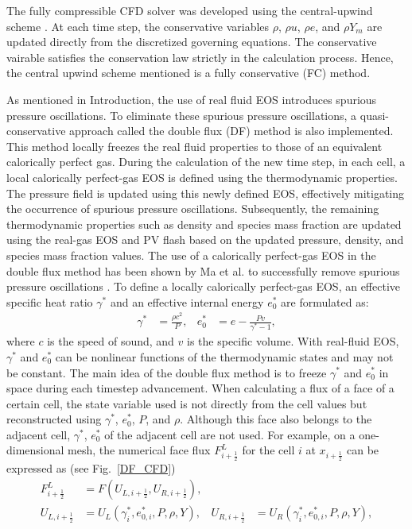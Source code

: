 The fully compressible CFD solver was developed using the central-upwind scheme \cite{kurganov2001semidiscrete,greenshields2010implementation}. At each time step, the conservative variables $\rho$, $\rho u$, $\rho e$, and $\rho Y_m$ are updated directly from the discretized governing equations. The conservative vairable satisfies the conservation law strictly in the calculation process. Hence, the central upwind scheme mentioned is a fully conservative (FC) method. 

As mentioned in Introduction, the use of real fluid EOS introduces spurious pressure oscillations. To eliminate these spurious pressure oscillations, a quasi-conservative approach called the double flux (DF) method \cite{abgrall2001computations,billet2003adaptive,ma2017entropy} is also implemented.
This method locally freezes the real fluid properties to those of an equivalent calorically perfect gas. During the calculation of the new time step, in each cell, a local calorically perfect-gas EOS is defined using the thermodynamic properties. The pressure field is updated using this newly defined EOS, effectively mitigating the occurrence of spurious pressure oscillations. Subsequently, the remaining thermodynamic properties such as density and species mass fraction are updated using the real-gas EOS and PV flash based on the updated pressure, density, and species mass fraction values. The use of a calorically perfect-gas EOS in the double flux method has been shown by Ma et al. to successfully remove spurious pressure oscillations \cite{ma2017entropy}. To define a locally calorically perfect-gas EOS, an effective specific heat ratio $\gamma^*$ and an effective internal energy $e_0^*$  are formulated as:
\begin{align}
\gamma^*& = \frac{\rho c^2}{P},&e_0^*&= e-\frac{Pv}{\gamma^*-1}, \label{eq:IGEOS}
\end{align}
where $c$ is the speed of sound, and $v$ is the specific volume. %
With real-fluid EOS, $\gamma^*$ and $e_0^*$ can be nonlinear functions of the thermodynamic states and may not be constant. The main idea of the double flux method is to freeze $\gamma^*$ and $e_0^*$ in space during each timestep advancement. When calculating a flux of a face of a certain cell, the state variable used is not directly from the cell values but reconstructed using $\gamma^*$, $e_0^*$, $P$, and $\rho$. Although this face also belongs to the adjacent cell, $\gamma^*$, $e_0^*$ of the adjacent cell are not used.  For example, on a one-dimensional mesh, the numerical face flux $F^L_{i+\frac{1}{2}}$ for the cell $i$ at $x_{i+\frac{1}{2}}$ can be expressed as (see Fig.~\ref{DF_CFD})
\begin{align}
    F^L_{i+\frac{1}{2}}& = F\left(U_{L,i+\frac{1}{2}},U_{R,i+\frac{1}{2}}\right), \\
    U_{L,i+\frac{1}{2}}& = U_L\left(\gamma^*_i,e_{0,i}^*,P,\rho ,Y\right) ,&
    U_{R,i+\frac{1}{2}}& = U_R\left(\gamma^*_i,e_{0,i}^*,P,\rho ,Y\right),
\end{align}


